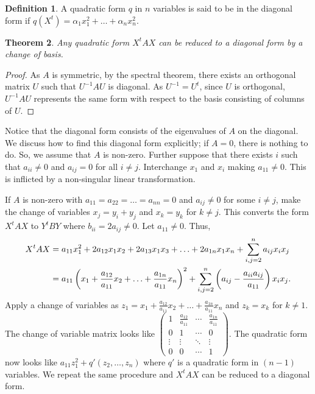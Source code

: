 \documentclass[15pt,a4paper]{book}
\newtheorem{theorem}{Theorem}[chapter]
\theoremstyle{definition}
\newtheorem{definition}[theorem]{Definition}
\begin{document}
\begin{definition}
    A quadratic form $q$ in $n$ variables is said to be in the diagonal form if $q(X^{t}) = \alpha_{1}x_{1}^{2} + \ldots + \alpha_{n}x_{n}^{2}$.
\end{definition}

\begin{theorem}
    Any quadratic form $X^{t}AX$ can be reduced to a diagonal form by a change of basis.
\end{theorem}
\begin{proof}
    As $A$ is symmetric, by the spectral theorem, there exists an orthogonal matrix $U$ such that $U^{-1}AU$ is diagonal. As $U^{-1} = U^{t}$, since $U$ is orthogonal, $U^{-1}AU$ represents the same form with respect to the basis consisting of columns of $U$.
\end{proof}

Notice that the diagonal form consists of the eigenvalues of $A$ on the diagonal. We discuss how to find this diagonal form explicitly; if $A = 0$, there is nothing to do. So, we assume that $A$ is non-zero. Further suppose that there exists $i$ such that $a_{ii} \neq 0$ and $a_{ij} = 0$ for all $i \neq j$. Interchange $x_{1}$ and $x_{i}$ making $a_{11} \neq 0$. This is inflicted by a non-singular linear transformation.

If $A$ is non-zero with $a_{11} = a_{22} = \ldots = a_{nn} = 0$ and $a_{ij} \neq 0$ for some $i \neq j$, make the change of variables $x_{j} = y_{i} + y_{j}$ and $x_{k} = y_{k}$ for $k \neq j$. This converts the form $X^{t}AX$ to $Y^{t}BY$ where $b_{ii} = 2a_{ij} \neq 0$. Let $a_{11} \neq 0$. Thus,
\begin{align}
    X^{t}AX &= a_{11}x_{1}^{2} + 2a_{12}x_{1}x_{2} + 2a_{13}x_{1}x_{3} + \ldots + 2a_{1n}x_{1}x_{n} + \sum_{i,j=2}^{n} a_{ij}x_{i}x_{j} \notag \\
    &= a_{11} \left( x_{1} + \frac{a_{12}}{a_{11}}x_{2} + \ldots + \frac{a_{1n}}{a_{11}} x_{n} \right)^{2} + \sum_{i,j=2}^{n} \left( a_{ij} - \frac{a_{ii}a_{ij}}{a_{11}} \right)x_{i}x_{j}.
\end{align}
Apply a change of variables as $z_{1} = x_{1} + \frac{a_{12}}{a_{11}}x_{2} + \ldots + \frac{a_{1n}}{a_{11}}x_{n}$ and $z_{k} = x_{k}$ for $k \neq 1$. The change of variable matrix looks like $\begin{pmatrix}
    1 & \frac{a_{12}}{a_{11}} & \cdots & \frac{a_{1n}}{a_{11}} \\
    0 & 1 & \cdots & 0 \\
    \vdots & \vdots & \ddots & \vdots \\
    0 & 0 & \cdots & 1
\end{pmatrix}$. The quadratic form now looks like $a_{11}z_{1}^{2} + q'(z_{2},\ldots,z_{n})$ where $q'$ is a quadratic form in $(n-1)$ variables. We repeat the same procedure and $X^{t}AX$ can be reduced to a diagonal form.
\end{document}
